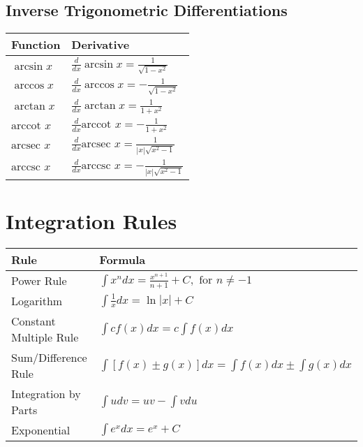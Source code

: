 \documentclass{article}
\begin{document}
\vspace{2em}

\subsection*{\large Inverse Trigonometric Differentiations}

\begin{center}
\begin{tabular}{|l|l|}
    \hline
    \textbf{Function} & \textbf{Derivative} \\
    \hline
    $\arcsin x$ & $\frac{d}{dx}\arcsin x = \frac{1}{\sqrt{1-x^2}}$ \\
    $\arccos x$ & $\frac{d}{dx}\arccos x = -\frac{1}{\sqrt{1-x^2}}$ \\
    $\arctan x$ & $\frac{d}{dx}\arctan x = \frac{1}{1+x^2}$ \\
    $\text{arccot } x$ & $\frac{d}{dx}\text{arccot } x = -\frac{1}{1+x^2}$ \\
    $\text{arcsec } x$ & $\frac{d}{dx}\text{arcsec } x = \frac{1}{|x|\sqrt{x^2-1}}$ \\
    $\text{arccsc } x$ & $\frac{d}{dx}\text{arccsc } x = -\frac{1}{|x|\sqrt{x^2-1}}$ \\
    \hline
\end{tabular}
\end{center}

\newpage

\section*{\Large Integration Rules}

\begin{center}
\begin{tabular}{|l|l|}
    \hline
    \textbf{Rule} & \textbf{Formula} \\
    \hline
    Power Rule & $\int x^n dx = \frac{x^{n+1}}{n+1} + C, \text{ for } n \neq -1$ \\
    Logarithm & $\int \frac{1}{x} dx = \ln|x| + C$ \\
    Constant Multiple Rule & $\int cf(x) dx = c \int f(x) dx$ \\
    Sum/Difference Rule & $\int [f(x) \pm g(x)] dx = \int f(x) dx \pm \int g(x) dx$ \\
    Integration by Parts & $\int u dv = uv - \int v du$ \\
    Exponential & $\int e^x dx = e^x + C$ \\
    \hline
\end{tabular}
\end{center}
\end{document}
